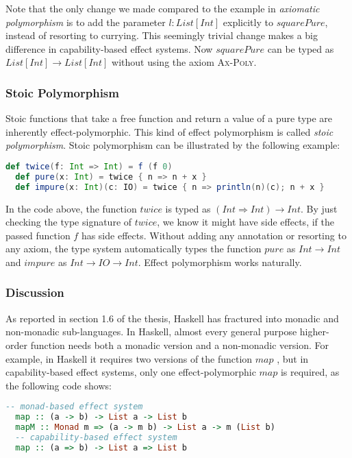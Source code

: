 Note that the only change we made compared to the example in
\emph{axiomatic polymorphism} is to add the parameter $l: List[Int]$
explicitly to $squarePure$, instead of resorting to currying. This
seemingly trivial change makes a big difference in capability-based
effect systems. Now $squarePure$ can be typed as
$List[Int] \to List[Int]$ without using the axiom \textsc{Ax-Poly}.

\subsubsection{Stoic Polymorphism}

Stoic functions that take a free function and return a value of a pure
type are inherently effect-polymorphic. This kind of effect
polymorphism is called \emph{stoic polymorphism}.  Stoic polymorphism
can be illustrated by the following example:

\begin{lstlisting}[language=Scala]
  def twice(f: Int => Int) = f (f 0)
  def pure(x: Int) = twice { n => n + x }
  def impure(x: Int)(c: IO) = twice { n => println(n)(c); n + x }
\end{lstlisting}

In the code above, the function $twice$ is typed as
$(Int \Rightarrow Int) \to Int$. By just checking the type signature
of $twice$, we know it might have side effects, if the passed function
$f$ has side effects. Without adding any annotation or resorting to
any axiom, the type system automatically types the function $pure$ as
$Int \to Int$ and $impure$ as $Int \to IO \to Int$. Effect
polymorphism works naturally.

\subsubsection{Discussion}

As reported in section 1.6 of the thesis\cite{lippmeier2009type},
Haskell has fractured into monadic and non-monadic sub-languages. In
Haskell, almost every general purpose higher-order function needs both
a monadic version and a non-monadic version. For example, in Haskell
it requires two versions of the function $map$ , but in
capability-based effect systems, only one effect-polymorphic $map$ is
required, as the following code shows:

\begin{lstlisting}[language=Haskell]
  -- monad-based effect system
  map :: (a -> b) -> List a -> List b
  mapM :: Monad m => (a -> m b) -> List a -> m (List b)
  -- capability-based effect system
  map :: (a => b) -> List a => List b
\end{lstlisting}

